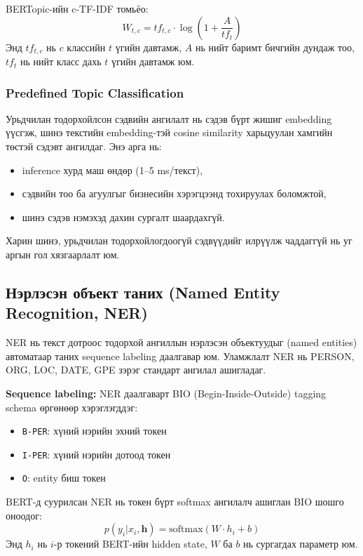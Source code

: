 BERTopic-ийн c-TF-IDF томьёо:
\begin{equation}
    W_{t,c} = tf_{t,c} \cdot \log\left(1 + \frac{A}{tf_t}\right)
\end{equation}
Энд $tf_{t,c}$ нь $c$ классийн $t$ үгийн давтамж, $A$ нь нийт баримт бичгийн дундаж тоо, $tf_t$ нь нийт класс дахь $t$ үгийн давтамж юм.

\subsubsection{Predefined Topic Classification}

Урьдчилан тодорхойлсон сэдвийн ангилалт нь сэдэв бүрт жишиг embedding үүсгэж, шинэ текстийн embedding-тэй cosine similarity харьцуулан хамгийн төстэй сэдэвт ангилдаг. Энэ арга нь:
\begin{itemize}
    \item inference хурд маш өндөр (1--5 ms/текст),
    \item сэдвийн тоо ба агуулгыг бизнесийн хэрэгцээнд тохируулах боломжтой,
    \item шинэ сэдэв нэмэхэд дахин сургалт шаардахгүй.
\end{itemize}
Харин шинэ, урьдчилан тодорхойлогдоогүй сэдвүүдийг илрүүлж чаддаггүй нь уг аргын гол хязгаарлалт юм.

\subsection{Нэрлэсэн объект таних (Named Entity Recognition, NER)}

NER нь текст дотроос тодорхой ангиллын нэрлэсэн объектуудыг (named entities) автоматаар таних sequence labeling даалгавар юм. Уламжлалт NER нь PERSON, ORG, LOC, DATE, GPE зэрэг стандарт ангилал ашигладаг.

\textbf{Sequence labeling:} NER даалгаварт BIO (Begin-Inside-Outside) tagging schema өргөнөөр хэрэглэгддэг:
\begin{itemize}
    \item \texttt{B-PER}: хүний нэрийн эхний токен
    \item \texttt{I-PER}: хүний нэрийн дотоод токен
    \item \texttt{O}: entity биш токен
\end{itemize}

BERT-д суурилсан NER нь токен бүрт softmax ангилалч ашиглан BIO шошго оноодог:
\begin{equation}
    p(y_i | x_i, \mathbf{h}) = \text{softmax}(W \cdot h_i + b)
\end{equation}
Энд $h_i$ нь $i$-р токений BERT-ийн hidden state, $W$ ба $b$ нь сургагдах параметр юм.

